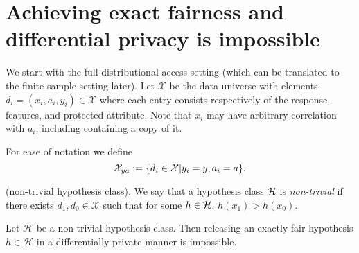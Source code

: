 
\section{Achieving exact fairness and differential privacy is impossible}
We start with the full distributional access setting (which can be translated to the finite sample setting later). Let $\mathcal{X}$ be the data universe with elements $d_i = (x_i,a_i,y_i) \in \mathcal{X}$ where each entry consists respectively of the response, features, and protected attribute. Note that $x_i$ may have arbitrary correlation with $a_i$, including containing a copy of it.



\begin{defn}
	For ease of notation we define
	$$\mathcal{X}_{ya} := \{d_i \in \mathcal{X} | y_i = y, a_i = a \}.$$
\end{defn}
\begin{defn}
	(non-trivial hypothesis class). We say that a hypothesis class $\mathcal{H}$ is  \emph{non-trivial} if there exists $d_1, d_0 \in \mathcal{X}$ such that for some $h \in \mathcal{H}$, $h(x_1) > h(x_0)$.
\end{defn}
\begin{lemma}Let $\mathcal{H}$ be a non-trivial hypothesis class. Then
  releasing an exactly fair hypothesis $h\in \mathcal{H}$ in a
  differentially private manner is impossible.
\end{lemma}

